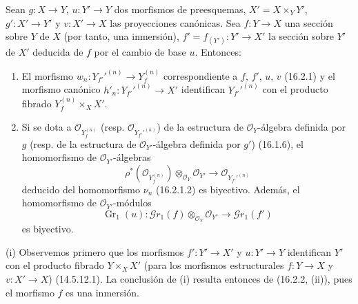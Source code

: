 \begin{corollary}[16.2.3]
\label{IV.16.2.3}
Sean $g:X\to Y$, $u:Y'\to Y$ dos morfismos de preesquemas,
$X'=X\times_Y Y'$, $g':X'\to Y'$ y $v:X'\to X$ las proyecciones canónicas.
Sea $f:Y\to X$ una sección sobre $Y$ de $X$ (por tanto, una inmersión),
$f'=f_{(Y')}:Y'\to X'$ la sección sobre $Y'$ de $X'$ deducida de $f$ por el
cambio de base $u$. Entonces:
\begin{enumerate}
\item[\textup{(i)}] El morfismo
$w_n:Y_{f'}'^{(n)}\to Y_f^{(n)}$ correspondiente a $f$, $f'$, $u$, $v$
\textup{(16.2.1)} y el morfismo canónico
$h'_n:Y_{f'}'^{(n)}\to X'$ identifican $Y_{f'}'^{(n)}$ con el producto fibrado
$Y_f^{(n)}\times_X X'$.
\item[\textup{(ii)}] Si se dota a $\mathcal{O}_{Y_f^{(n)}}$ \textup{(resp.}
$\mathcal{O}_{Y_{f'}'^{(n)}}$\textup{)} de la estructura de $\mathcal{O}_Y$-álgebra
definida por $g$ \textup{(resp.} de la estructura de $\mathcal{O}_{Y'}$-álgebra definida
por $g'$\textup{)} \textup{(16.1.6)}, el homomorfismo de $\mathcal{O}_{Y'}$-álgebras
\[
  \rho^*(\mathcal{O}_{Y_f^{(n)}})
  \otimes_{\mathcal{O}_Y}\mathcal{O}_{Y'}
  \longrightarrow
  \mathcal{O}_{Y_{f'}'^{(n)}}
  \tag{16.2.3.1}
  \label{IV.16.2.3.1}
\]
deducido del homomorfismo $\nu_n$ \textup{(16.2.1.2)} es biyectivo. Además,
el homomorfismo de $\mathcal{O}_{Y'}$-módulos
\[
  \operatorname{Gr}_1(u):
  \mathscr{G}r_1(f)\otimes_{\mathcal{O}_Y}\mathcal{O}_{Y'}
  \longrightarrow\mathscr{G}r_1(f')
  \tag{16.2.3.2}
  \label{IV.16.2.3.2}
\]
es biyectivo.
\end{enumerate}
\end{corollary}

\noindent(i) Observemos primero que los morfismos $f':Y'\to X'$ y $u:Y'\to Y$
identifican $Y'$ con el producto fibrado $Y\times_X X'$ (para los morfismos estructurales
$f:Y\to X$ y $v:X'\to X$) (14.5.12.1). La conclusión de (i) resulta entonces de
(16.2.2, (ii)), pues el morfismo $f$ es una inmersión.

